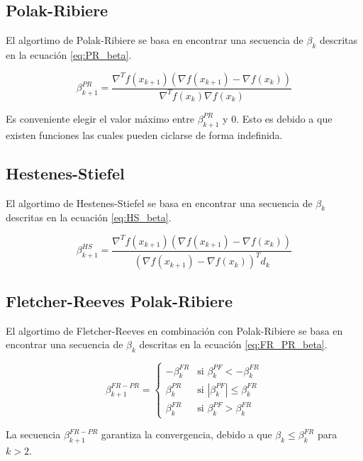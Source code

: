 \subsection{Polak-Ribiere}

El algortimo de Polak-Ribiere\cite{polak_1969} se basa en encontrar una secuencia de $\beta_k$ descritas en la ecuación \ref{eq:PR_beta}.

\begin{equation}
    \beta_{k+1}^{PR} = \frac{\nabla^T f(x_{k+1})(\nabla f(x_{k+1})-\nabla f(x_{k}))}{\nabla^T f(x_{k})\nabla f(x_{k})} \label{eq:PR_beta}
\end{equation}

Es conveniente elegir el valor máximo entre $\beta_{k+1}^{PR}$ y 0. Esto es debido a que existen funciones las cuales pueden ciclarse de forma indefinida.

\subsection{Hestenes-Stiefel}

El algortimo de Hestenes-Stiefel\cite{hestenes_1978} se basa en encontrar una secuencia de $\beta_k$ descritas en la ecuación \ref{eq:HS_beta}.

\begin{equation}
    \beta_{k+1}^{HS} = \frac{\nabla^T f(x_{k+1})(\nabla f(x_{k+1})-\nabla f(x_{k}))}{(\nabla f(x_{k+1})-\nabla f(x_{k}))^Td_{k}} \label{eq:HS_beta}
\end{equation}


\subsection{Fletcher-Reeves Polak-Ribiere}

El algortimo de Fletcher-Reeves en combinación con Polak-Ribiere\cite{Babaie_2014} se basa en encontrar una secuencia de $\beta_k$ descritas en la ecuación \ref{eq:FR_PR_beta}.

\begin{equation}
    \beta_{k+1}^{FR-PR} = \begin{cases}
        -\beta_k^{FR} & \text{si } \beta_k^{PF} < -\beta_k^{FR}     \\
        \beta_k^{PR}  & \text{si } |\beta_k^{PF}| \leq \beta_k^{FR} \\
        \beta_k^{FR}  & \text{si } \beta_k^{PF} >\beta_k^{FR}
    \end{cases} \label{eq:FR_PR_beta}
\end{equation}

La secuencia $\beta_{k+1}^{FR-PR}$ garantiza la convergencia, debido a que $\beta_k \leq \beta_k^{FR}$ para $k>2$.
